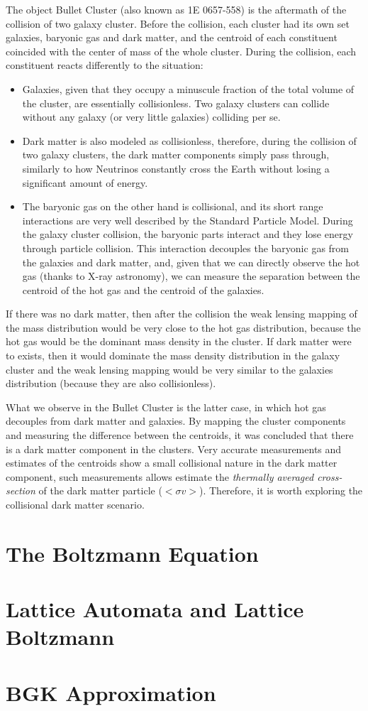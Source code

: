 The object Bullet Cluster (also known as 1E 0657-558) is the aftermath of the collision of two galaxy cluster.
Before the collision, each cluster had its own set galaxies, baryonic gas and dark matter, and the centroid of each constituent coincided with the center of mass of the whole cluster.
During the collision, each constituent reacts differently to the situation:
\begin{itemize}
\item Galaxies, given that they occupy a minuscule fraction of the total volume of the cluster, are essentially collisionless. Two galaxy clusters can collide without any galaxy (or very little galaxies) colliding per se. 
\item Dark matter is also modeled as collisionless, therefore, during the collision of two galaxy clusters, the dark matter components simply pass through, similarly to how Neutrinos constantly cross the Earth without losing a significant amount of energy.
\item The baryonic gas on the other hand is collisional, and its short range interactions are very well described by the Standard Particle Model. During the galaxy cluster collision, the baryonic parts interact and they lose energy through particle collision. This interaction decouples the baryonic gas from the galaxies and dark matter, and, given that we can directly observe the hot gas (thanks to X-ray astronomy), we can measure the separation between the centroid of the hot gas and the centroid of the galaxies.
\end{itemize}

If there was no dark matter, then after the collision the weak lensing mapping of the mass distribution would be very close to the hot gas distribution, because the hot gas would be the dominant mass density in the cluster. If dark matter were to exists, then it would dominate the mass density distribution in the galaxy cluster and the weak lensing mapping would be very similar to the galaxies distribution (because they are also collisionless).

What we observe in the Bullet Cluster is the latter case, in which hot gas decouples from dark matter and galaxies. By mapping the cluster components and measuring the difference between the centroids, it was concluded that there is a dark matter component in the clusters. Very accurate measurements and estimates of the centroids show a small collisional nature in the dark matter component, such measurements allows estimate the \emph{thermally averaged cross-section} of the dark matter particle ($<\sigma v>$). Therefore, it is worth exploring the collisional dark matter scenario.

\section{The Boltzmann Equation}


\section{Lattice Automata and Lattice Boltzmann}

\section{BGK Approximation}
\label{bgk}
